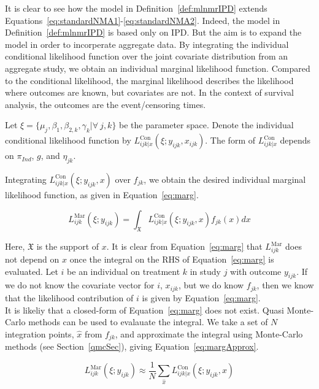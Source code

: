 It is clear to see how the model in Definition~\ref{def:mlnmrIPD} extends Equations~\ref{eq:standardNMA1}-\ref{eq:standardNMA2}.  Indeed, the model in Definition~\ref{def:mlnmrIPD} is based only on IPD. But the aim is to expand the model in order to incorperate aggregate data. By integrating the individual conditional likelihood function over the joint covariate distribution from an aggregate study, we obtain an individual marginal likelihood function. Compared to the conditional likelihood, the marginal likelihood describes the likelihood where outcomes are known, but covariates are not. In the context of survival analysis, the outcomes are the event/censoring times. 

Let $\xi = \{\mu_j, \beta_1, \beta_{2,k}, \gamma_k | \forall \ j,k \}$ be the parameter space. Denote the individual conditional likelihood function by $L_{ijk|x}^{\text{Con}}(\xi; y_{ijk}, x_{ijk})$. The form of $L_{ijk|x}^{\text{Con}}$ depends on $\pi_{Ind}$, $g$, and $\eta_{jk}$.

Integrating $L_{ijk|x}^{\text{Con}}(\xi; y_{ijk}, x)$ over $f_{jk}$, we obtain the desired individual marginal likelihood function, as given in Equation~\ref{eq:marg}. 

\begin{equation}
    L_{ijk}^{\text{Mar}}(\xi; y_{ijk}) = \int_{\mathfrak{X}} L_{ijk|x}^{\text{Con}}(\xi; y_{ijk}, x)f_{jk}(x)dx
    \label{eq:marg}
\end{equation}

Here, $\mathfrak{X}$ is the support of $x$. It is clear from Equation~\ref{eq:marg} that $L_{ijk}^{\text{Mar}}$ does not depend on $x$ once the integral on the RHS of Equation~\ref{eq:marg} is evaluated. Let $i$ be an individual on treatment $k$ in study $j$ with outcome $y_{ijk}$. If we do not know the covariate vector for $i$, $x_{ijk}$, but we do know $f_{jk}$, then we know that the likelihood contribution of $i$ is given by Equation~\ref{eq:marg}. \\

It is likeliy that a closed-form of Equation~\ref{eq:marg} does not exist. Quasi Monte-Carlo methods can be used to evalauate the integral. We take a set of $N$ integration points, $\hat{x}$ from $f_{jk}$, and approximate the integral using Monte-Carlo methods (see Section~\ref{qmcSec}), giving Equation~\ref{eq:margApprox}.

\begin{equation}
    L_{ijk}^{\text{Mar}}(\xi; y_{ijk}) \approx \frac{1}{N}\sum_{\hat{x}}L_{ijk|x}^{\text{Con}}(\xi;y_{ijk},x)
    \label{eq:margApprox}
\end{equation}

